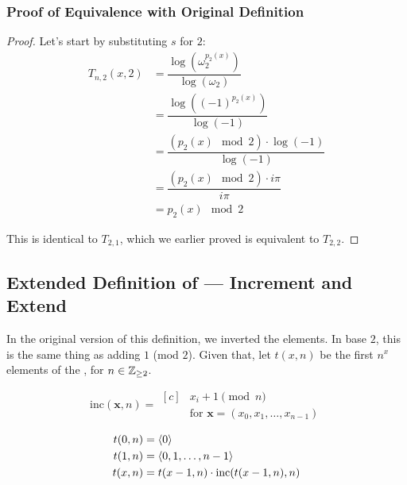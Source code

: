 \documentclass[conference]{IEEEtran}
\begin{document}
\subsubsection{Proof of Equivalence with Original Definition }

\begin{proof}
    Let's start by substituting $s$ for $2$:
    \begin{equation}
    \begin{aligned}
        T_{n,2}(x, 2) &= \dfrac{\log\left(\omega_2^{p_2(x)}\right)}{\log(\omega_2)} \\
                      &= \dfrac{\log\left((-1)^{p_2(x)}\right)}{\log(-1)} \\
                      &= \dfrac{(p_2(x) \mod{2}) \cdot \log(-1)}{\log(-1)} \\
                      &= \dfrac{(p_2(x) \mod{2}) \cdot i\pi}{i\pi} \\
                      &= p_2(x) \mod{2}
    \end{aligned}
    \end{equation}

    This is identical to $T_{2,1}$, which we earlier proved is equivalent to $T_{2,2}$.
\end{proof}

\subsection{Extended Definition  of \TotalExtensions\xspace --- Increment and Extend}

In the original version of this definition, we inverted the elements. In base $2$, this is the same thing as adding $1$ (mod $2$). Given that, let $t(x, n)$ be the first $n^x$ elements of the \ETMS, for $n \in \mathbb{Z}_{\ge 2}$.

\begin{equation}
    \text{inc}(\mathbf{x}, n) = \begin{aligned}[c]
            &x_i + 1 \pmod{n} \\
            &\text{for } \mathbf{x} = (x_0, x_1, \ldots, x_{n-1})
    \end{aligned}
\end{equation}

\begin{equation}
    \begin{aligned}
t(0, n) &= \langle 0 \rangle \\
t(1, n) &= \langle 0, 1, \ldots, n - 1 \rangle \\
t(x, n) &= t(x - 1, n) \cdot \text{inc}(t(x - 1, n), n)
    \end{aligned}
\end{equation}
\end{document}
